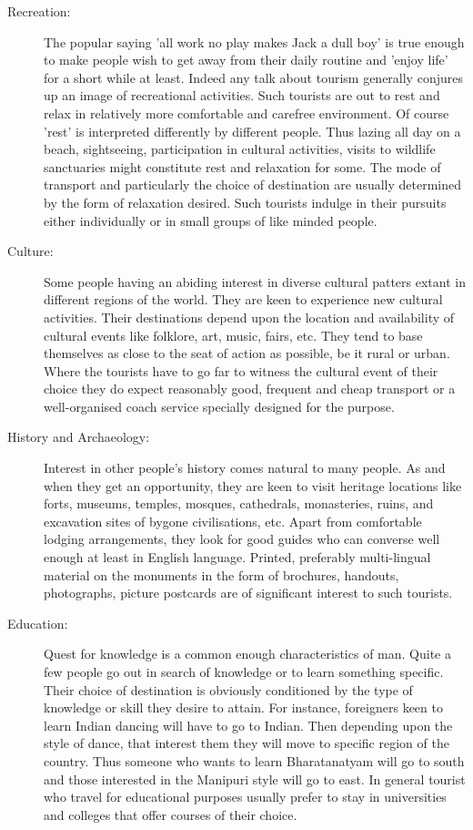 \begin{description}

  \item[Recreation:] The popular saying 'all work no play makes Jack a dull boy' is true enough to make people wish to get away from their daily routine and 'enjoy life' for a short while at least. Indeed any talk about tourism generally conjures up an image of recreational activities. Such tourists are out to rest and relax in relatively more comfortable and carefree environment. Of course 'rest' is interpreted differently by different people. Thus lazing all day on a beach, sightseeing, participation in cultural activities, visits to wildlife sanctuaries might constitute rest and relaxation for some. The mode of transport and particularly the choice of destination are usually determined by the form of relaxation desired. Such tourists indulge in their pursuits either individually or in small groups of like minded people.

  \item[Culture:] Some people having an abiding interest in diverse cultural patters extant in different regions of the world. They are keen to experience new cultural activities. Their destinations depend upon the location and availability of cultural events like folklore, art, music, fairs, etc. They tend to base themselves as close to the seat of action as possible, be it rural or urban. Where the tourists have to go far to witness the cultural event of their choice they do expect reasonably good, frequent and cheap transport or a well-organised coach service specially designed for the purpose.

  \item[History and Archaeology:] Interest in other people's history comes natural to many people. As and when they get an opportunity, they are keen to visit heritage locations like forts, museums, temples, mosques, cathedrals, monasteries, ruins, and excavation sites of bygone civilisations, etc. Apart from comfortable lodging arrangements, they look for good guides who can converse well enough at least in English language. Printed, preferably multi-lingual material on the monuments in the form of brochures, handouts, photographs, picture postcards are of significant interest to such tourists.

  \item[Education:] Quest for knowledge is a common enough characteristics of man. Quite a few people go out in search of knowledge or to learn something specific. Their choice of destination is obviously conditioned by the type of knowledge or skill they desire to attain. For instance, foreigners keen to learn Indian dancing will have to go to Indian. Then depending upon the style of dance, that interest them they will move to specific region of the country. Thus someone who wants to learn Bharatanatyam will go to south and those interested in the Manipuri style will go to east. In general tourist who travel for educational purposes usually prefer to stay in universities and colleges that offer courses of their choice.


\end{description}

